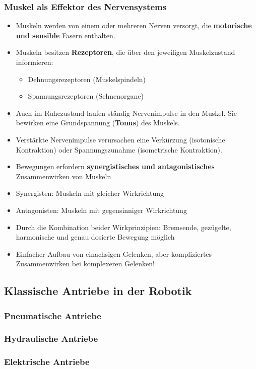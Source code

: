 \subsubsection{Muskel als Effektor des Nervensystems}
\begin{itemize}
	\item Muskeln werden von einem oder mehreren Nerven versorgt, die \textbf{motorische und sensible} Fasern enthalten.
	\item Muskeln besitzen \textbf{Rezeptoren}, die über den jeweiligen Muskelzustand
informieren:
	\begin{itemize}
		\item Dehnungsrezeptoren (Muskelspindeln)
		\item Spannungsrezeptoren (Sehnenorgane)	
	\end{itemize}
	\item Auch im Ruhezustand laufen ständig Nervenimpulse in den Muskel. Sie bewirken eine Grundspannung (\textbf{Tonus}) des Muskels.
	\item Verstärkte Nervenimpulse verursachen eine Verkürzung (isotonische Kontraktion) oder Spannungszunahme (isometrische Kontraktion).
	\item Bewegungen erfordern \textbf{synergistisches und antagonistisches} Zusammenwirken von Muskeln
	\item Synergisten: Muskeln mit gleicher Wirkrichtung
	\item Antagonisten: Muskeln mit gegensinniger Wirkrichtung
	\item Durch die Kombination beider Wirkprinzipien: Bremsende, gezügelte, harmonische und genau dosierte Bewegung möglich
	\item Einfacher Aufbau von einachsigen Gelenken, aber kompliziertes Zusammenwirken bei komplexeren Gelenken!
\end{itemize}
\subsection{Klassische Antriebe in der Robotik}
\subsubsection{Pneumatische Antriebe}
\subsubsection{Hydraulische Antriebe}
\subsubsection{Elektrische Antriebe}
